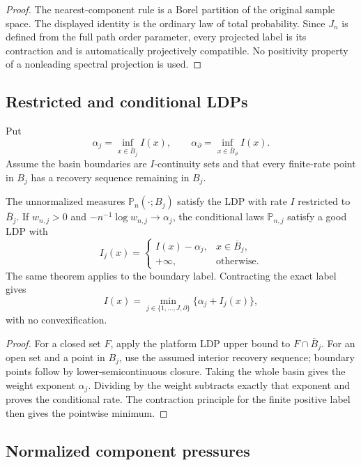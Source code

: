 \begin{proof}
The nearest-component rule is a Borel partition of the original sample space.
The displayed identity is the ordinary law of total probability.  Since
$J_n$ is defined from the full path order parameter, every projected label is
its contraction and is automatically projectively compatible.  No positivity
property of a nonleading spectral projection is used.
\end{proof}

\subsection{Restricted and conditional LDPs}

Put
\[
 \alpha_j=\inf_{x\in\overline B_j}I(x),
 \qquad
 \alpha_\partial=\inf_{x\in\overline B_\partial}I(x).
\]
Assume the basin boundaries are $I$-continuity sets and that every finite-rate
point in $B_j$ has a recovery sequence remaining in $B_j$.

\begin{theorem}
\label{thm:r13-d1-component}
The unnormalized measures
$\mathbb P_n(\cdot;B_j)$ satisfy the LDP with rate $I$ restricted to
$\overline B_j$.  If $w_{n,j}>0$ and
$-n^{-1}\log w_{n,j}\to\alpha_j$, the conditional laws
$\mathbb P_{n,j}$ satisfy a good LDP with
\[
 I_j(x)=
 \begin{cases}
 I(x)-\alpha_j,&x\in\overline B_j,\\
 +\infty,&\text{otherwise}.
 \end{cases}
\]
The same theorem applies to the boundary label.  Contracting the exact label
gives
\[
 I(x)=\min_{j\in\{1,\ldots,J,\partial\}}
       \{\alpha_j+I_j(x)\},
\]
with no convexification.
\end{theorem}

\begin{proof}
For a closed set $F$, apply the platform LDP upper bound to
$F\cap\overline B_j$.  For an open set and a point in $B_j$, use the assumed
interior recovery sequence; boundary points follow by lower-semicontinuous
closure.  Taking the whole basin gives the weight exponent $\alpha_j$.
Dividing by the weight subtracts exactly that exponent and proves the
conditional rate.  The contraction principle for the finite positive label
then gives the pointwise minimum.
\end{proof}

\subsection{Normalized component pressures}

